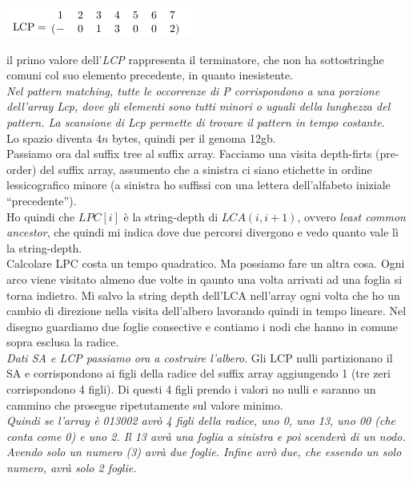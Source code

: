 \documentclass[a4paper,12pt, oneside]{book}
\begin{document}
\begin{center}
  \includegraphics[scale = 0.7]{img/sa2.png}
\end{center}
il primo valore dell'\textit{LCP} rappresenta il terminatore, che non
ha sottostringhe comuni col suo elemento precedente, in quanto
inesistente.\\
\textit{Nel pattern matching, tutte le occorrenze di P corrispondono a
  una porzione dell’array Lcp, dove 
gli elementi sono tutti minori o uguali della lunghezza del
pattern. La scansione di Lcp permette di 
trovare il pattern in tempo costante.}\\
Lo spazio diventa $4n$ bytes, quindi per il genoma 12gb.\\
Passiamo ora dal suffix tree al suffix array. Facciamo una visita depth-firts
(pre-order) del suffix array, assumento che a sinistra ci siano
etichette in ordine lessicografico minore (a sinistra ho suffissi con
una lettera dell'alfabeto iniziale ``precedente'').\\
Ho quindi che $LPC[i]$ è la string-depth di $LCA(i, i+1)$, ovvero
\textit{least common ancestor}, che quindi mi indica dove due percorsi
divergono e vedo quanto vale lì la string-depth.\\
Calcolare LPC costa un tempo quadratico. Ma possiamo fare un altra
cosa. Ogni arco viene visitato almeno due volte in qaunto una volta arrivati
ad una foglia si torna indietro. Mi salvo la string depth dell'LCA
nell'array ogni volta che ho un cambio di direzione nella visita dell'albero
lavorando quindi in tempo lineare. Nel disegno guardiamo due foglie
consective e contiamo i nodi che hanno in comune sopra esclusa la radice.\\
\textit{Dati SA e LCP passiamo ora a costruire l'albero}. Gli LCP nulli
partizionano il SA e corrispondono ai figli della radice del suffix
array aggiungendo 1 (tre zeri corrispondono 4 figli). Di questi 4
figli prendo i valori no nulli e saranno un cammino che prosegue
ripetutamente sul valore minimo.\\
\textit{Quindi se l'array è 013002 avrò 4 figli della radice, uno 0, uno 13,
  uno 00 (che conta come 0) e uno 2. Il 13 avrà una foglia a sinistra e
  poi scenderà di un nodo. Avendo solo un numero (3) avrà due
  foglie. Infine avrò due, che essendo un solo numero, avrà solo 2
  foglie.}\\
\end{document}
